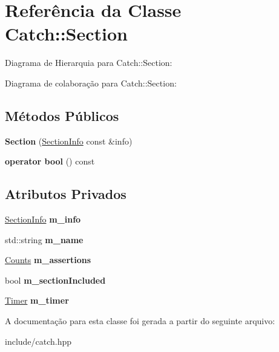 \hypertarget{classCatch_1_1Section}{}\section{Referência da Classe Catch\+:\+:Section}
\label{classCatch_1_1Section}


Diagrama de Hierarquia para Catch\+:\+:Section\+:


Diagrama de colaboração para Catch\+:\+:Section\+:
\subsection*{Métodos Públicos}
\begin{DoxyCompactItemize}
\item 
{\bfseries Section} (\hyperlink{structCatch_1_1SectionInfo}{Section\+Info} const \&info)\hypertarget{classCatch_1_1Section_a68fd4e51e8981aaa7ddb00d8a6abd099}{}\label{classCatch_1_1Section_a68fd4e51e8981aaa7ddb00d8a6abd099}

\item 
{\bfseries operator bool} () const \hypertarget{classCatch_1_1Section_a6c9be48e8ba0611c4aa601102e706f3b}{}\label{classCatch_1_1Section_a6c9be48e8ba0611c4aa601102e706f3b}

\end{DoxyCompactItemize}
\subsection*{Atributos Privados}
\begin{DoxyCompactItemize}
\item 
\hyperlink{structCatch_1_1SectionInfo}{Section\+Info} {\bfseries m\+\_\+info}\hypertarget{classCatch_1_1Section_a22f54832b33b341ae5a78807a6219af6}{}\label{classCatch_1_1Section_a22f54832b33b341ae5a78807a6219af6}

\item 
std\+::string {\bfseries m\+\_\+name}\hypertarget{classCatch_1_1Section_a29a372077fda582bbd79fb192067f277}{}\label{classCatch_1_1Section_a29a372077fda582bbd79fb192067f277}

\item 
\hyperlink{structCatch_1_1Counts}{Counts} {\bfseries m\+\_\+assertions}\hypertarget{classCatch_1_1Section_ae0a2acc394d4bd1bc7a51a1445d25034}{}\label{classCatch_1_1Section_ae0a2acc394d4bd1bc7a51a1445d25034}

\item 
bool {\bfseries m\+\_\+section\+Included}\hypertarget{classCatch_1_1Section_a038bb0d5d2718df6e3ae1ece4b3d695d}{}\label{classCatch_1_1Section_a038bb0d5d2718df6e3ae1ece4b3d695d}

\item 
\hyperlink{classCatch_1_1Timer}{Timer} {\bfseries m\+\_\+timer}\hypertarget{classCatch_1_1Section_a1548993afa64305a1b093391c6884b7e}{}\label{classCatch_1_1Section_a1548993afa64305a1b093391c6884b7e}

\end{DoxyCompactItemize}


A documentação para esta classe foi gerada a partir do seguinte arquivo\+:\begin{DoxyCompactItemize}
\item 
include/catch.\+hpp\end{DoxyCompactItemize}
